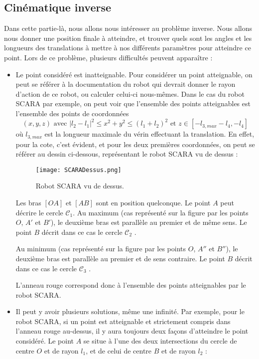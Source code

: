 \subsection{Cinématique inverse}

Dans cette partie-là, nous allons nous intéresser au problème inverse. Nous allons nous donner une position finale à atteindre, et trouver quels sont les angles et les longueurs des translations à mettre à nos différents paramètres pour atteindre ce point. Lors de ce problème, plusieurs difficultés peuvent apparaître : 
\begin{itemize}
\item Le point considéré est inatteignable. Pour considérer un point atteignable, on peut se référer à la documentation du robot qui devrait donner le rayon d'action de ce robot, ou calculer celui-ci nous-mêmes. 
Dans le cas du robot SCARA par exemple, on peut voir que l'ensemble des points atteignables est l'ensemble des points de coordonnées $$(x,y,z)\text{ avec } |l_2-l_1|^2 \leq x^2+y^2 \leq (l_1+l_2)^2 \text{ et } z\in [-l_{3,max}-l_4, -l_4] $$ $\text{où } l_{3,max}$ est la longueur maximale du vérin effectuant la translation. En effet, pour la cote, c'est évident, et pour les deux premières coordonnées, on peut se référer au dessin ci-dessous, représentant le robot SCARA vu de dessus : 
\newpage

\begin{figure}[!ht]
\centering
\texttt{[image: SCARADessus.png]}
\caption{Robot SCARA vu de dessus.}
\end{figure}

Les bras $[OA]$ et $[AB]$ sont en position quelconque. Le point $A$ peut décrire le cercle $\mathscr{C}_1$. Au maximum (cas représenté sur la figure par les points $O$, $A'$ et $B'$), le deuxième bras est parallèle au premier et de même sens. Le point $B$ décrit dans ce cas le cercle $\mathscr{C}_2$ . 

Au minimum (cas représenté sur la figure par les points $O$, $A''$ et $B''$), le deuxième bras est parallèle au premier et de sens contraire. Le point $B$ décrit dans ce cas le cercle $\mathscr{C}_3$ . 

L'anneau rouge correspond donc à l'ensemble des points atteignables par le robot SCARA. 

\item Il peut y avoir plusieurs solutions, même une infinité. Par exemple, pour le robot SCARA, si un point est atteignable et strictement compris dans l'anneau rouge au-dessus, il y aura toujours deux façons d'atteindre le point considéré. Le point $A$ se situe à l'une des deux intersections du cercle de centre $O$ et de rayon $l_1$, et de celui de centre $B$ et de rayon $l_2$ : \newpage


\end{itemize}
